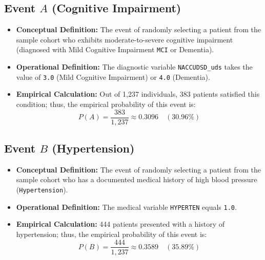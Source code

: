 \documentclass[11pt, a4paper]{article}
\begin{document}
\subsection{Event $A$ (Cognitive Impairment)}
\begin{itemize}
    \item \textbf{Conceptual Definition:} The event of randomly selecting a patient from the sample cohort who exhibits moderate-to-severe cognitive impairment (diagnosed with Mild Cognitive Impairment \texttt{MCI} or Dementia).
    \item \textbf{Operational Definition:} The diagnostic variable \texttt{NACCUDSD\_uds} takes the value of \texttt{3.0} (Mild Cognitive Impairment) or \texttt{4.0} (Dementia).
    \item \textbf{Empirical Calculation:} Out of 1,237 individuals, 383 patients satisfied this condition; thus, the empirical probability of this event is:
    \[
    P(A) = \frac{383}{1,237} \approx 0.3096 \quad (30.96\%)
    \]
\end{itemize}

\subsection{Event $B$ (Hypertension)}
\begin{itemize}
    \item \textbf{Conceptual Definition:} The event of randomly selecting a patient from the sample cohort who has a documented medical history of high blood pressure (\texttt{Hypertension}).
    \item \textbf{Operational Definition:} The medical variable \texttt{HYPERTEN} equals \texttt{1.0}.
    \item \textbf{Empirical Calculation:} 444 patients presented with a history of hypertension; thus, the empirical probability of this event is:
    \[
    P(B) = \frac{444}{1,237} \approx 0.3589 \quad (35.89\%)
    \]
\end{itemize}
\end{document}
